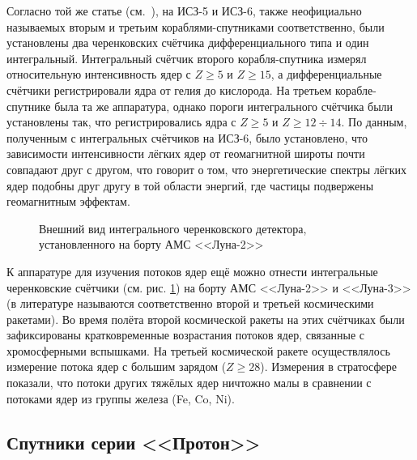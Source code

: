 \documentclass[12pt,a4paper]{report} %
\begin{document}
Согласно той же статье (см.~\cite{Ginzburg}), на ИСЗ-5 и ИСЗ-6, также неофициально называемых вторым и третьим кораблями-спутниками соответственно, были установлены два черенковских счётчика дифференциального типа и один интегральный. Интегральный счётчик второго корабля-спутника измерял относительную интенсивность ядер с $Z\geq5$ и $Z\geq15$, а дифференциальные счётчики регистрировали ядра от гелия до кислорода. 
На третьем корабле-спутнике была та же аппаратура, однако пороги интегрального счётчика были установлены так, что регистрировались ядра с $Z\geq5$ и $Z\geq12\div14$.
По данным, полученным с интегральных счётчиков на ИСЗ-6, было установлено, что зависимости интенсивности лёгких ядер от геомагнитной широты почти совпадают друг с другом, что говорит о том, что энергетические спектры лёгких ядер подобны друг другу в той области энергий, где частицы подвержены геомагнитным эффектам. 
\begin{figure}[th]
	\noindent{}
	\caption{Внешний вид интегрального черенковского детектора, установленного на борту АМС <<Луна-2>>}
	\label{picLunik}
\end{figure}
К аппаратуре для изучения потоков ядер ещё можно отнести интегральные черенковские счётчики (см. рис. \ref{picLunik}) на борту АМС <<Луна-2>> и <<Луна-3>> (в литературе называются соответственно второй и третьей космическими ракетами). Во время полёта второй космической ракеты на этих счётчиках были зафиксированы кратковременные возрастания потоков ядер, связанные с хромосферными вспышками. 
На третьей космической ракете осуществлялось измерение потока ядер с большим зарядом ($Z\geq28$). 
Измерения в стратосфере показали, что потоки других тяжёлых ядер ничтожно малы в сравнении с потоками ядер из группы железа (Fe, Co, Ni).
\subsection{Спутники серии <<Протон>>}
\end{document}
